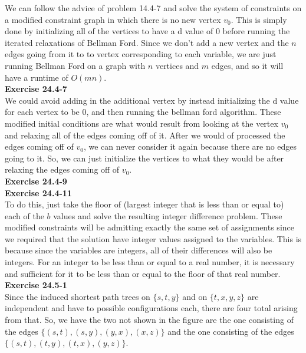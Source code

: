 \documentclass{article}
\begin{document}
We can follow the advice of problem 14.4-7 and solve the system of constraints on a modified constraint graph in which there is no new vertex $v_0$. This is simply done by initializing all of the vertices to have a d value of 0 before running the iterated relaxations of Bellman Ford. Since we don't add a new vertex and the $n$ edges going from it to to vertex corresponding to each variable, we are just running Bellman Ford on a graph with $n$ vertices and $m$ edges, and so it will have a runtime of $O(mn)$.\\



\noindent\textbf{Exercise 24.4-7}\\

We could avoid adding in the additional vertex by instead initializing the d value for each vertex to be 0, and then running the bellman ford algorithm. These modified initial conditions are what would result from looking at the vertex $v_0$ and relaxing all of the edges coming off of it. After we would of processed the edges coming off of $v_0$, we can never consider it again because there are no edges going to it. So, we can just initialize the vertices to what they would be after relaxing the edges coming off of $v_0$.\\



\noindent\textbf{Exercise 24.4-9}\\



\noindent\textbf{Exercise 24.4-11}\\

To do this, just take the floor of (largest integer that is less than or equal to) each of the $b$ values and solve the resulting integer difference problem. These modified constraints will be admitting exactly the same set of assignments since we required that the solution have integer values assigned to the variables. This is because since the variables are integers, all of their differences will also be integers. For an integer to be less than or equal to a real number, it is necessary and sufficient for it to be less than or equal to the floor of that real number.\\



\noindent\textbf{Exercise 24.5-1}\\

Since the induced shortest path trees on $\{s,t,y\}$ and on $\{t,x,y,z\}$ are independent and have to possible configurations each, there are four total arising from that. So, we have the two not shown in the figure are the one consisting of the edges $\{(s,t),(s,y),(y,x),(x,z)\}$ and the one consisting of the edges $\{(s,t),(t,y),(t,x),(y,z)\}$.\\
\end{document}
